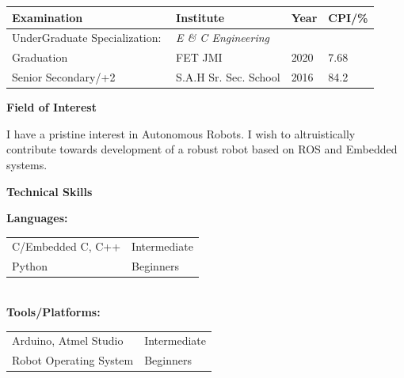 \documentclass[a4paper,12pt,final]{memoir}
\newcommand{\Sep}{\vspace{1.5em}}
\newcommand{\SmallSep}{\vspace{0.5em}}
\newcommand{\CVSection}[1]
	{\Large\textbf{#1}\par
	\SmallSep\normalsize\normalfont}
\newcommand{\CVItem}[1]
	{\textbf{\color{RoyalBlue} #1}}
\begin{document}
\indent \begin{tabular}{ l l l l}
\hline
\textbf{\color{RoyalBlue}Examination} & \textbf{\color{RoyalBlue}Institute} & \textbf{\color{RoyalBlue}Year} & \textbf{\color{RoyalBlue}CPI/\%} \\
\hline
UnderGraduate Specialization:\,\, & \textit{E \& C Engineering} \\
Graduation & FET JMI & 2020 & 7.68 \\
\hline
Senior Secondary/+2 & S.A.H Sr. Sec. School & 2016 & 84.2\\
\hline
\end{tabular}
\Sep

\CVSection{Field of Interest}

\begin{compactitem}[\color{RoyalBlue}$\circ$]
\item\noindent I have a pristine interest in Autonomous Robots. I wish to altruistically contribute towards development of a robust robot based on ROS and Embedded systems.
\end{compactitem}
\SmallSep


\CVSection{Technical Skills}
\CVItem{Languages:}
\\
\begin{tabular}{l l}
C/Embedded C, C++ & Intermediate\\
Python & Beginners
\end{tabular} 
\\
\CVItem{Tools/Platforms:}
\\
\begin{tabular}{l l}
Arduino, Atmel Studio & Intermediate\\
Robot Operating System & Beginners\\

\end{tabular}
\Sep

\end{document}
